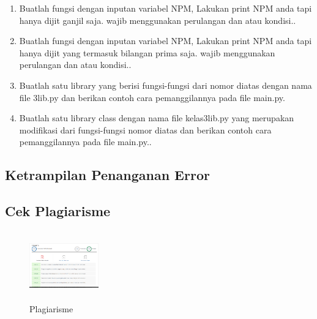 \begin{enumerate}
	\item Buatlah fungsi dengan inputan variabel NPM, Lakukan print NPM anda tapi hanya dijit ganjil saja. wajib menggunakan perulangan dan atau kondisi..
	
	
	\item Buatlah fungsi dengan inputan variabel NPM, Lakukan print NPM anda tapi hanya dijit yang termasuk bilangan prima saja. wajib menggunakan perulangan dan atau kondisi..
	
	
	\item Buatlah satu library yang berisi fungsi-fungsi dari nomor diatas dengan nama file 3lib.py dan berikan contoh cara pemanggilannya pada file main.py.
	
	
	\item Buatlah satu library class dengan nama file kelas3lib.py yang merupakan modifikasi dari fungsi-fungsi nomor diatas dan berikan contoh cara pemanggilannya pada file main.py..
	
	
\end{enumerate}
\subsection{Ketrampilan Penanganan Error}


\subsection{Cek Plagiarisme}
\begin{figure}[!htbp]
	\centering
	\includegraphics[width=3cm,height=3cm]{figures/nico/plagiarisme.png}
	\caption{Plagiarisme}
	\label{plagiarisme}
\end{figure}